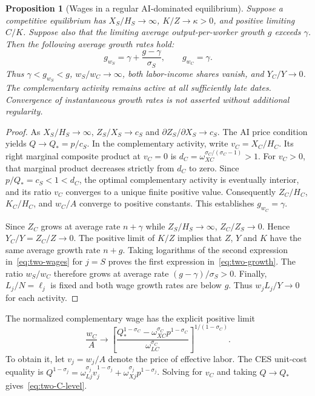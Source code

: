 \documentclass[11pt]{article}
\newtheorem{proposition}{Proposition}
\begin{document}
\begin{proposition}[Wages in a regular AI-dominated equilibrium]
Suppose a competitive equilibrium has $X_S/H_S\to\infty$,
$K/Z\to\kappa>0$, and positive limiting $C/K$. Suppose also that the
limiting average output-per-worker growth $g$ exceeds $\gamma$.
Then the following average growth rates hold:
\begin{equation}
 g_{w_S}=\gamma+\frac{g-\gamma}{\sigma_S},\qquad
 g_{w_C}=\gamma.
 \label{eq:two-growth}
\end{equation}
Thus $\gamma<g_{w_S}<g$, $w_S/w_C\to\infty$, both labor-income
shares vanish, and $Y_C/Y\to0$. The complementary activity remains
active at all sufficiently late dates. Convergence of instantaneous growth
rates is not asserted without additional regularity.
\end{proposition}
\begin{proof}
As $X_S/H_S\to\infty$, $Z_S/X_S\to c_S$ and
$\partial Z_S/\partial X_S\to c_S$. The AI price condition yields
$Q\to Q_*=p/c_S$. In the complementary activity, write $v_C=X_C/H_C$.
Its right marginal composite product at $v_C=0$ is
$d_C=\omega_{XC}^{\sigma_C/(\sigma_C-1)}>1$.
For $v_C>0$, that marginal product decreases strictly from $d_C$ to zero.
Since $p/Q_*=c_S<1<d_C$, the optimal complementary activity is eventually
interior, and its ratio $v_C$ converges to a unique finite positive value.
Consequently $Z_C/H_C$, $K_C/H_C$, and $w_C/A$ converge to positive constants.
This establishes $g_{w_C}=\gamma$.

Since $Z_C$ grows at average rate $n+\gamma$ while $Z_S/H_S\to\infty$,
$Z_C/Z_S\to0$. Hence $Y_C/Y=Z_C/Z\to0$. The positive limit of $K/Z$
implies that $Z$, $Y$ and $K$ have the same average growth rate $n+g$.
Taking logarithms of the second expression in~\eqref{eq:two-wages}
for $j=S$ proves the first expression in~\eqref{eq:two-growth}.
The ratio $w_S/w_C$ therefore grows at average rate
$(g-\gamma)/\sigma_S>0$. Finally, $L_j/N=\ell_j$ is fixed and both wage
growth rates are below $g$. Thus $w_j L_j/Y\to0$ for each activity.
\end{proof}

The normalized complementary wage has the explicit positive limit
\begin{equation}
 \frac{w_C}{A}\longrightarrow
 \left[
 \frac{Q_*^{1-\sigma_C}-\omega_{XC}^{\sigma_C}p^{1-\sigma_C}}
 {\omega_{LC}^{\sigma_C}}
 \right]^{1/(1-\sigma_C)}.
 \label{eq:two-C-level}
\end{equation}
To obtain it, let $v_j=w_j/A$ denote the price of effective labor.
The CES unit-cost equality is
$Q^{1-\sigma_j}=\omega_{Lj}^{\sigma_j}v_j^{1-\sigma_j}
+\omega_{Xj}^{\sigma_j}p^{1-\sigma_j}$.
Solving for $v_C$ and taking $Q\to Q_*$ gives~\eqref{eq:two-C-level}.
\end{document}
